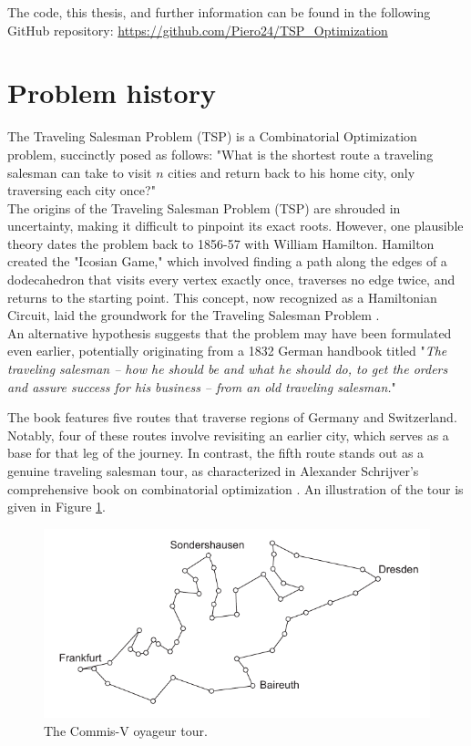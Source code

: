 \noindent The code, this thesis, and further information can be found in the following GitHub repository: \url{https://github.com/Piero24/TSP_Optimization}


\section{Problem history}
The Traveling Salesman Problem (TSP) is a Combinatorial Optimization problem, succinctly posed as follows: "What is the shortest route a traveling salesman can take to visit \( n \) cities and return back to his home city, only traversing each city once?" \\

\noindent The origins of the Traveling Salesman Problem (TSP) are shrouded in uncertainty, making it difficult to pinpoint its exact roots. However, one plausible theory dates the problem back to 1856-57 with William Hamilton. Hamilton created the "Icosian Game," which involved finding a path along the edges of a dodecahedron that visits every vertex exactly once, traverses no edge twice, and returns to the starting point. This concept, now recognized as a Hamiltonian Circuit, laid the groundwork for the Traveling Salesman Problem \cite{biron2006}. \\

\noindent An alternative hypothesis suggests that the problem may have been formulated even earlier, potentially originating from a 1832 German handbook titled "\textit{The traveling salesman – how he should be and what he should do, to get the orders and assure success for his business – from an old traveling salesman.}"

The book features five routes that traverse regions of Germany and Switzerland. Notably, four of these routes involve revisiting an earlier city, which serves as a base for that leg of the journey. In contrast, the fifth route stands out as a genuine traveling salesman tour, as characterized in Alexander Schrijver's comprehensive book on combinatorial optimization \cite{unknown:TSP}. An illustration of the tour is given in Figure \ref{fig:TSP_path}. 

\begin{figure}
    \centering
    \includegraphics[width=0.9\linewidth]{Immagini/TsP_path.pdf}
    \caption{The Commis-V oyageur tour.}
    \label{fig:TSP_path}
\end{figure}

